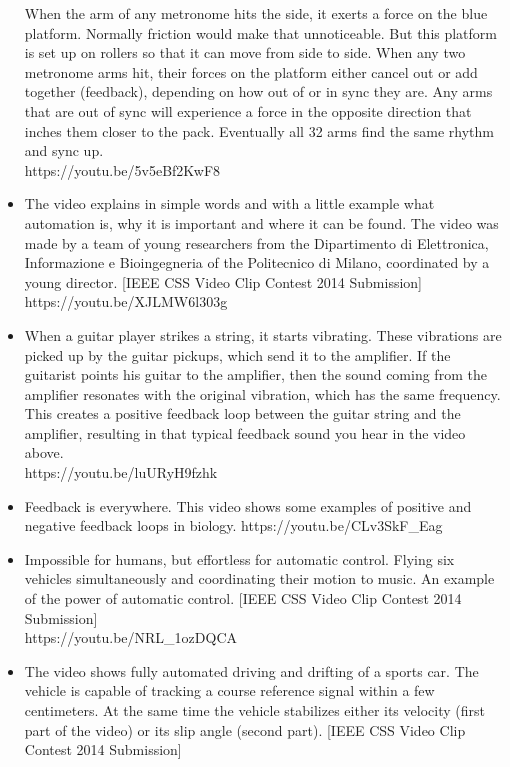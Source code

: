 \documentclass{document}
\begin{document}
\begin{itemize}
			When the arm of any metronome hits the side, it exerts a force on the blue platform. Normally friction would make that unnoticeable. But this platform is set up on rollers so that it can move from side to side.
			When any two metronome arms hit, their forces on the platform either cancel out or add together (feedback), depending on how out of or in sync they are. Any arms that are out of sync will experience a force in the opposite direction that inches them closer to the pack. 
			Eventually all 32 arms find the same rhythm and sync up.\\
			https://youtu.be/5v5eBf2KwF8
			\item The video explains in simple words and with a little example what automation is, why it is important and where it can be found.
			The video was made by a team of young researchers from the Dipartimento di Elettronica, Informazione e Bioingegneria of the Politecnico di Milano, coordinated by a young director.
			[IEEE CSS Video Clip Contest 2014 Submission]
			https://youtu.be/XJLMW6l303g
			\item When a guitar player strikes a string, it starts vibrating. These vibrations are picked up by the guitar pickups, which send it to the amplifier. If the guitarist points his guitar to the amplifier, then the sound coming from the amplifier resonates with the original vibration, which has the same frequency. This creates a positive feedback loop between the guitar string and the amplifier, resulting in that typical feedback sound you hear in the video above.\\
			https://youtu.be/luURyH9fzhk
			\item Feedback is everywhere. This video shows some examples of positive and negative feedback loops in biology. 
			https://youtu.be/CLv3SkF_Eag
			\item Impossible for humans, but effortless for automatic control.
			Flying six vehicles simultaneously and coordinating their motion to music. An example of the power of automatic control.
			[IEEE CSS Video Clip Contest 2014 Submission] \\
			https://youtu.be/NRL_1ozDQCA
			\item The video shows fully automated driving and drifting of a sports car. The vehicle is capable of tracking a course reference signal within a few centimeters. At the same time the vehicle stabilizes either its velocity (first part of the video) or its slip angle (second part).
			[IEEE CSS Video Clip Contest 2014 Submission]\\

\end{itemize}
\end{document}

